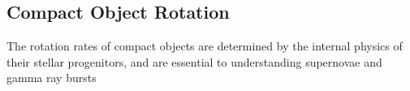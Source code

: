 {\color{orange}

\subsection{Compact Object Rotation}

The rotation rates of compact objects are determined by the internal physics of their stellar progenitors, and are essential to understanding supernovae and gamma ray bursts

}